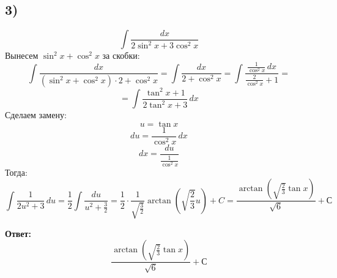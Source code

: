 \documentclass[a4paper,12pt]{article}
\begin{document}
\subsection*{3)}
\[
\int \frac{dx}{2\sin^2x + 3\cos^2x }
\]
Вынесем $\sin^2x + \cos^2x$ за скобки:
\[
\int \frac{dx}{(\sin^2x + \cos^2x) \cdot 2 + \cos^2 x}  = \int \frac{dx}{2 + \cos^2 x} = \int \frac{\frac{1}{\cos ^ 2x} \, dx}{\frac{2}{\cos ^ 2x} + 1} = 
\]
\[
=
\int \frac{\tan^2 x + 1}{2 \tan^2x + 3} \, dx \]
Сделаем замену:
\[
u = \tan x 
\]
\[
du = \frac{1}{\cos^2x} \, dx
\]
\[
dx = \frac{du}{\frac{1}{\cos^2x}}
\]
Тогда:
\[
\int \frac{1}{2u^2 + 3} \, du = \frac{1}{2} \int \frac{du}{u^2 + \frac{3}{2}} = \frac{1}{2} \cdot \frac{1}{\sqrt{\frac{3}{2}}} \arctan (\sqrt{\frac{2}{3}} u) + C = \frac{\arctan\left( \sqrt{\frac{2}{3}} \tan x \right)}{\sqrt{6}} + С
\]
\begin{center}
\textbf{Ответ: } 
\[
\frac{\arctan\left(\sqrt{ \frac{2}{3}} \tan x \right)}{\sqrt{6}} + С
\]
\end{center}
\end{document}
